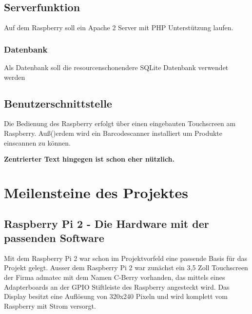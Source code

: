 \documentclass[11pt,a4paper]{article} %
\begin{document}
\subsection{Serverfunktion}
Auf dem Raspberry soll ein Apache 2 Server mit PHP Unterst\"utzung laufen.
\subsubsection{Datenbank}
Als Datenbank soll die resourcenschonendere SQLite Datenbank verwendet werden

\subsection{Benutzerschnittstelle}
Die Bedienung des Raspberry erfolgt \"uber einen eingebauten Touchscreen am Raspberry. Au\ss()erdem wird ein Barcodescanner installiert um Produkte einscannen zu k\"onnen.

\begin{center}
\begin{large}
\textbf{Zentrierter Text hingegen ist schon eher nützlich.}
\end{large}
\end{center}


\section{Meilensteine des Projektes}
\label{Umbrueche}

\subsection{Raspberry Pi 2 - Die Hardware mit der passenden Software}
Mit dem Raspberry Pi 2 war schon im Projektvorfeld eine passende Basis f\"ur das Projekt gelegt. Ausser dem Raspberry Pi 2 war zun\"achst ein 3,5 Zoll Touchscreen der Firma admatec mit dem Namen C-Berry vorhanden, das mittels eines Adapterboards an der GPIO Stiftleiste des Raspberry angesteckt wird. Das Display besitzt eine Aufl\"osung von 320x240 Pixeln und wird komplett vom Raspberry mit Strom versorgt.
\par
\end{document}
